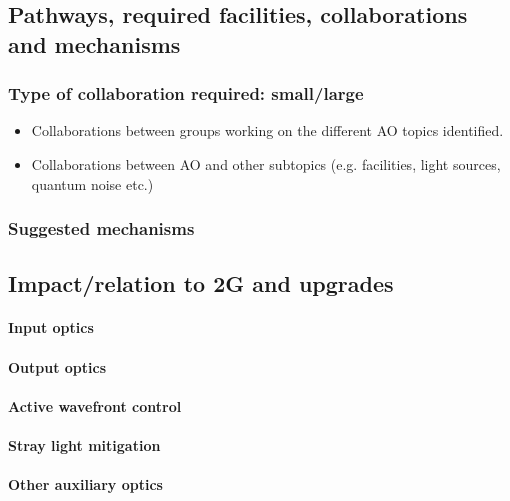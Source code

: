 \subsection{Pathways, required facilities, collaborations and mechanisms}

\subsubsection{Type of collaboration required:  small/large}
\begin{itemize}
\item Collaborations between groups working on the different AO topics identified. 
\item Collaborations between AO and other subtopics (e.g. facilities, light sources, quantum noise etc.)
\end{itemize}
\subsubsection{Suggested mechanisms}

\subsection{Impact/relation to 2G and upgrades}
\paragraph{Input optics}
\paragraph{Output optics}
\paragraph{Active wavefront control}
\paragraph{Stray light mitigation}
\paragraph{Other auxiliary optics}